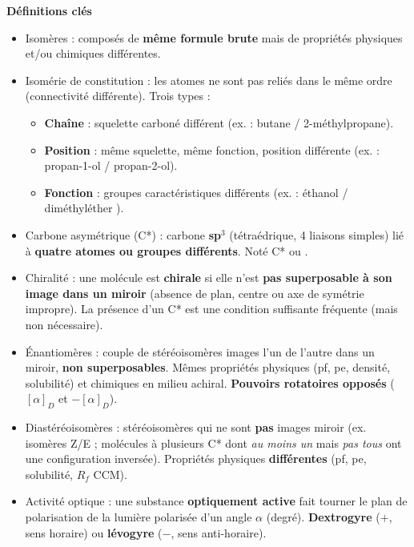 \documentclass[11pt]{article}
\newcommand{\cle}[1]{{\popxbold\color{popdark}#1}}
\newcounter{popsec}
\newcounter{popsub}
\newcommand{\courssub}[1]{%
  \stepcounter{popsub}%
  \par\vspace{9pt}\noindent{\popxbold\fontsize{11.5}{13}\selectfont\color{popink}{\color{poporange}\thepopsec.\thepopsub}\hspace{6pt}#1}\par\nopagebreak\vspace{4pt}
}
\begin{document}
\courssub{L'essentiel à retenir}

\begin{aretenir}
\textbf{Définitions clés}
\begin{itemize}
  \item \cle{Isomères} : composés de \textbf{même formule brute} mais de propriétés physiques et/ou chimiques différentes.
  \item \cle{Isomérie de constitution} : les atomes ne sont pas reliés dans le même ordre (connectivité différente). Trois types :
        \begin{itemize}
          \item \textbf{Chaîne} : squelette carboné différent (ex.  : butane / 2-méthylpropane).
          \item \textbf{Position} : même squelette, même fonction, position différente (ex.  : propan-1-ol / propan-2-ol).
          \item \textbf{Fonction} : groupes caractéristiques différents (ex.  : éthanol  / diméthyléther ).
        \end{itemize}
  \item \cle{Carbone asymétrique} (C*) : carbone \textbf{sp$^3$} (tétraédrique, 4 liaisons simples) lié à \textbf{quatre atomes ou groupes différents}. Noté C* ou .
  \item \cle{Chiralité} : une molécule est \textbf{chirale} si elle n'est \textbf{pas superposable à son image dans un miroir} (absence de plan, centre ou axe de symétrie impropre). La présence d'un C* est une condition suffisante fréquente (mais non nécessaire).
  \item \cle{Énantiomères} : couple de stéréoisomères images l'un de l'autre dans un miroir, \textbf{non superposables}. Mêmes propriétés physiques (pf, pe, densité, solubilité) et chimiques en milieu achiral. \textbf{Pouvoirs rotatoires opposés} ($[\alpha]_D$ et $-[\alpha]_D$).
  \item \cle{Diastéréoisomères} : stéréoisomères qui ne sont \textbf{pas} images miroir (ex. isomères Z/E ; molécules à plusieurs C* dont \emph{au moins un} mais \emph{pas tous} ont une configuration inversée). Propriétés physiques \textbf{différentes} (pf, pe, solubilité, $R_f$ CCM).
  \item \cle{Activité optique} : une substance \textbf{optiquement active} fait tourner le plan de polarisation de la lumière polarisée d'un angle $\alpha$ (degré). \textbf{Dextrogyre} ($+$, sens horaire) ou \textbf{lévogyre} ($-$, sens anti-horaire).

\end{itemize}
\end{aretenir}
\end{document}

